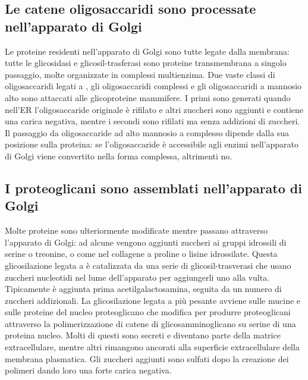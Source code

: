 \subsection{Le catene oligosaccaridi sono processate nell'apparato di Golgi}
Le proteine residenti nell'apparato di Golgi sono tutte legate dalla membrana: tutte le glicosidasi e glicosil-trasferasi sono proteine transmembrana a singolo passaggio, molte 
organizzate in complessi multienzima. Due vaste classi di oligosaccaridi legati a , gli oligosaccaridi complessi e gli oligosaccaridi a mannosio alto sono attaccati alle
glicoproteine mammifere. I primi sono generati quando nell'ER l'oligosaccaride originale \`e rifilato e altri zuccheri sono aggiunti e contiene una carica negativa, mentre i secondi sono
rifilati ma senza addizioni di zuccheri. Il passaggio da oligosaccaride ad alto mannosio a complesso dipende dalla sua posizione sulla proteina: se l'oligosaccaride \`e accessibile
agli enzimi nell'apparato di Golgi viene convertito nella forma complessa, altrimenti no. 
\subsection{I proteoglicani sono assemblati nell'apparato di Golgi}
Molte proteine sono ulteriormente modificate mentre passano attraverso l'apparato di Golgi: ad alcune vengono aggiunti zuccheri ai gruppi idrossili di serine o treonine, o come nel 
collagene a proline o lisine idrossilate. Questa glicosilazione legata a  \`e catalizzata da una serie di glicosil-trasverasi che usano zuccheri nucleotidi nel lume dell'apparato
per aggiungerli uno alla vulta. Tipicamente \`e aggiunta prima acetilgalactosamina, seguita da un numero di zuccheri addizionali. La glicosilazione legata a  pi\`u pesante
avviene sulle mucine e sulle proteine del nucleo proteoglicano che modifica per produrre proteoglicani attraverso la polimerizzazione di catene di glicosamminoglicano su serine di una
proteina nucleo. Molti di questi sono secreti e diventano parte della matrice extracellulare, mentre altri rimangono ancorati alla superficie extracellulare della membrana plasmatica. 
Gli zuccheri aggiunti sono sulfati dopo la creazione dei polimeri dando loro una forte carica negativa. 
